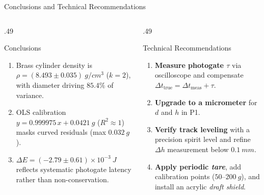 \documentclass[aspectratio=169,10pt]{beamer}
\newcommand{\sm}{\fontsize{8.2}{10.2}\selectfont}
\begin{document}
\begin{frame}{Conclusions and Technical Recommendations}
\begin{columns}[T,onlytextwidth]
\begin{column}{.49\textwidth}
\begin{block}{Conclusions}\sm
\begin{enumerate}
\item Brass cylinder density is $\rho = (8.493 \pm 0.035)\ \si{g/cm^3}$ ($k=2$), with diameter driving $85.4\%$ of variance.
\item OLS calibration $y = 0.999975\,x + 0.0421\ \si{g}$ ($R^2 \approx 1$) masks curved residuals (max $\SI{0.032}{g}$).
\item $\Delta E = (-2.79 \pm 0.61)\times 10^{-3}\ \si{J}$ reflects systematic photogate latency rather than non-conservation.
\end{enumerate}
\end{block}
\end{column}

\begin{column}{.49\textwidth}
\begin{exampleblock}{Technical Recommendations}\sm
\begin{enumerate}
\item \textbf{Measure photogate $\tau$} via oscilloscope and compensate $\Delta t_{\mathrm{true}} = \Delta t_{\mathrm{meas}} + \tau$.
\item \textbf{Upgrade to a micrometer} for $d$ and $h$ in P1.
\item \textbf{Verify track leveling} with a precision spirit level and refine $\Delta h$ measurement below $\SI{0.1}{mm}$.
\item \textbf{Apply periodic \textit{tare}}, add calibration points ($50\text{--}200\ \si{g}$), and install an acrylic \textit{draft shield}.
\end{enumerate}
\end{exampleblock}
\end{column}
\end{columns}
\end{frame}
\end{document}
